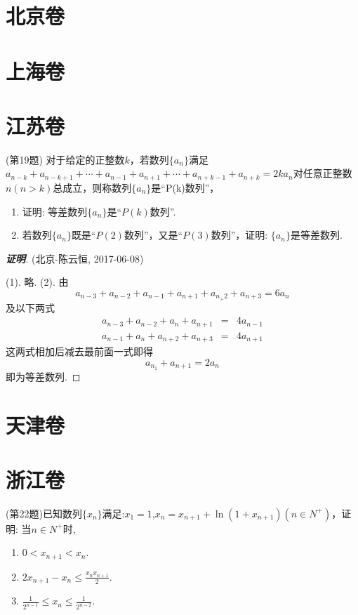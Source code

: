 \documentclass{ctexart}
\begin{document}
\section{北京卷}
\label{sec:beijing}

\section{上海卷}
\label{sec:shanghai}

\section{江苏卷}
\label{sec:jiangshu}

\begin{exercise}(第19题)
  对于给定的正整数$k$，若数列$\{a_n\}$满足$a_{n-k}+a_{n-k+1}+\cdots+a_{n-1}+a_{n+1}+\cdots+a_{n+k-1}+a_{n+k}=2ka_n$对任意正整数$n(n>k)$总成立，则称数列$\{a_n\}$是“P(k)数列”，
  \begin{enumerate}
  \item 证明: 等差数列$\{a_n\}$是“$P(k)$数列”.
  \item 若数列$\{a_n\}$既是“$P(2)$数列”，又是“$P(3)$数列”，证明: $\{a_n\}$是等差数列.
  \end{enumerate}
\end{exercise}

\begin{proof}[\textbf{证明}] (北京-陈云恒, 2017-06-08)

  (1). 略.
  (2). 由
  \[ a_{n-3}+a_{n-2}+a_{n-1}+a_{n+1}+a_{n_+2}+a_{n+3}=6a_n \]
  及以下两式
  \begin{eqnarray*}
    a_{n-3}+a_{n-2}+a_n+a_{n+1} & = &4a_{n-1} \\
    a_{n-1}+a_n+a_{n+2}+a_{n+3} & = &4a_{n+1} 
  \end{eqnarray*}
  这两式相加后减去最前面一式即得
  \[ a_{n_1}+a_{n+1}=2a_n \]
  即为等差数列.
\end{proof}

\section{天津卷}
\label{sec:tianjin}

\section{浙江卷}
\label{sec:zhejiang}

\begin{exercise}(第22题)已知数列$\{x_n\}$满足:$x_1=1$,$x_n=x_{n+1}+\ln{(1+x_{n+1})}(n \in N^+)$，证明: 当$n \in N^+$时,
  \begin{enumerate}
  \item $0<x_{n+1}<x_n$.
  \item $2x_{n+1}-x_n \leqslant \frac{x_nx_{n+1}}{2}$.
  \item $\frac{1}{2^{n-1}} \leqslant x_n \leqslant \frac{1}{2^{n-2}}$.
  \end{enumerate}
\end{exercise}
\end{document}
